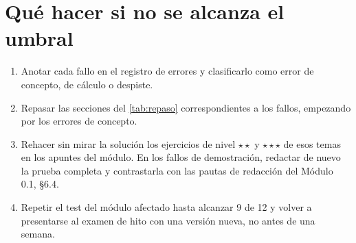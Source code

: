 \section{Qué hacer si no se alcanza el umbral}

\begin{enumerate}[label=\arabic*.]
  \item Anotar cada fallo en el registro de errores y clasificarlo como error de concepto, de cálculo o despiste.
  \item Repasar las secciones del \cref{tab:repaso} correspondientes a los fallos, empezando por los errores de concepto.
  \item Rehacer sin mirar la solución los ejercicios de nivel $\star\star$ y $\star\star\star$ de esos temas en los apuntes del módulo. En los fallos de demostración, redactar de nuevo la prueba completa y contrastarla con las pautas de redacción del Módulo 0.1, §6.4.
  \item Repetir el test del módulo afectado hasta alcanzar 9 de 12 y volver a presentarse al examen de hito con una versión nueva, no antes de una semana.
\end{enumerate}

